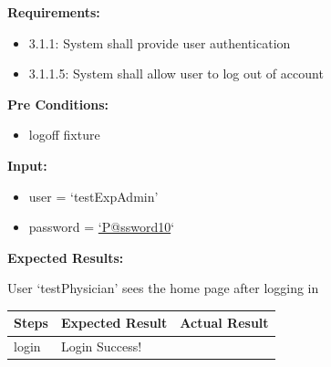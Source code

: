 \documentclass[letterpaper,10pt,english]{sphinxmanual}
\begin{document}
\begin{fulllineitems}
\label{STD/test_login:test_login.test_login_experiment_admin}
\textbf{Requirements:}
\begin{itemize}
\item {} 
3.1.1: System shall provide user authentication

\item {} 
3.1.1.5: System shall allow user to log out of account

\end{itemize}

\textbf{Pre Conditions:}
\begin{itemize}
\item {} 
logoff fixture

\end{itemize}

\textbf{Input:}
\begin{itemize}
\item {} 
user = `testExpAdmin'

\item {} 
password = \href{mailto:'P@ssword10}{`P@ssword10}`

\end{itemize}

\textbf{Expected Results:}

User `testPhysician' sees the home page after logging in

\begin{tabulary}{\linewidth}{|L|L|L|}
\hline
\textsf{\relax 
Steps
} & \textsf{\relax 
Expected Result
} & \textsf{\relax 
Actual Result
}\\
\hline
login
 & 
Login Success!
 & \\
\hline\end{tabulary}


\end{fulllineitems}

\end{document}
